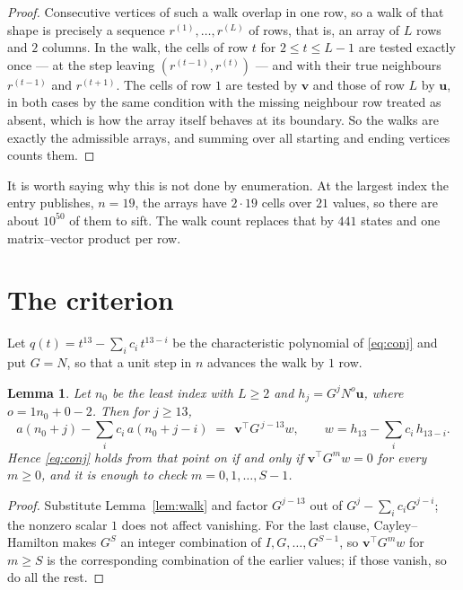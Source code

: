 \documentclass[11pt,a4paper]{article}
\theoremstyle{plain}
\newtheorem{lemma}[theorem]{Lemma}
\theoremstyle{definition}
\begin{document}
\begin{proof}
Consecutive vertices of such a walk overlap in one row, so a walk of that shape is
precisely a sequence $r^{(1)},\dots,r^{(L)}$ of rows, that is, an array of $L$ rows
and $2$ columns. In the walk, the cells of row $t$ for $2\le t\le L-1$ are tested
exactly once --- at the step leaving $(r^{(t-1)},r^{(t)})$ --- and with their true
neighbours $r^{(t-1)}$ and $r^{(t+1)}$. The cells of row $1$ are tested by
$\mathbf{v}$ and those of row $L$ by $\mathbf{u}$, in both cases by the same condition
with the missing neighbour row treated as absent, which is how the array itself behaves at
its boundary. So the walks are exactly the admissible arrays, and summing over all starting
and ending vertices counts them.
\end{proof}


It is worth saying why this is not done by enumeration. At the largest index the entry
publishes, $n=19$, the arrays have $2\cdot19$ cells over
$21$ values, so there are about $10^{50}$ of them to sift. The
walk count replaces that by $441$ states and one matrix--vector product per row.
\section{The criterion}

Let $q(t)=t^{13}-\sum_i c_i\,t^{13-i}$ be the characteristic polynomial of
\eqref{eq:conj} and put $G=N$, so that a unit step in $n$ advances the walk by
$1$ row.

\begin{lemma}\label{lem:crit}
Let $n_0$ be the least index with $L\ge2$ and $h_j=G^{j}N^{o}\mathbf{u}$, where
$o=1n_0+0-2$. Then for $j\ge13$,
\[
a(n_0+j)-\sum_i c_i\,a(n_0+j-i)\;=\;\,\mathbf{v}^{\!\top}G^{\,j-13}w,
\qquad w=h_{13}-\sum_i c_i\,h_{13-i} .
\]
Hence \eqref{eq:conj} holds from that point on if and only if
$\mathbf{v}^{\!\top}G^{m}w=0$ for every $m\ge0$, and it is enough to check
$m=0,1,\dots,S-1$.
\end{lemma}

\begin{proof}
Substitute Lemma~\ref{lem:walk} and factor $G^{j-13}$ out of
$G^{j}-\sum_ic_iG^{j-i}$; the nonzero scalar $1$ does not affect
vanishing. For the last clause, Cayley--Hamilton makes $G^{S}$ an integer combination of
$I,G,\dots,G^{S-1}$, so $\mathbf{v}^{\!\top}G^{m}w$ for $m\ge S$ is the corresponding
combination of the earlier values; if those vanish, so do all the rest.
\end{proof}
\end{document}

